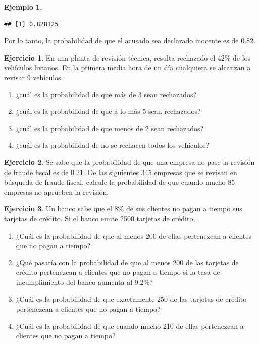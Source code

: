 \documentclass[
  11pt,
]{book}
\providecommand{\tightlist}{%
  \setlength{\itemsep}{0pt}\setlength{\parskip}{0pt}}
\theoremstyle{definition}
\theoremstyle{definition}
\newtheorem{example}{Ejemplo}[chapter]
\theoremstyle{definition}
\newtheorem{exercise}{Ejercicio}[chapter]
\theoremstyle{definition}
\theoremstyle{remark}
\begin{document}
\begin{example}
\begin{verbatim}
## [1] 0.828125
\end{verbatim}

Por lo tanto, la probabilidad de que el acusado sea declarado inocente es de 0.82.
\end{example}

\begin{exercise}

En una planta de revisión técnica, resulta rechazado el \(42 \%\) de los vehículos livianos. En la primera media hora de un día cualquiera se alcanzan a revisar 9 vehículos.

\begin{enumerate}
\def\labelenumi{\arabic{enumi}.}
\tightlist
\item
  ¿cuál es la probabilidad de que más de 3 sean rechazados?
\item
  ¿cuál es la probabilidad de que a lo más 5 sean rechazados?
\item
  ¿cuál es la probabilidad de que menos de 2 sean rechazados?
\item
  ¿cuál es la probabilidad de no se rechacen todos los vehículos?
\end{enumerate}

\end{exercise}

\begin{exercise}
Se sabe que la probabilidad de que una empresa no pase la revisión de fraude fiscal es de 0.21. De las siguientes 345 empresas que se revisan en búsqueda de fraude fiscal, calcule la probabilidad de que cuando mucho 85 empresas no aprueben la revisión.
\end{exercise}

\begin{exercise}

Un banco sabe que el 8\% de sus clientes no pagan a tiempo sus tarjetas de crédito. Si el banco emite 2500 tarjetas de crédito,

\begin{enumerate}
\def\labelenumi{\arabic{enumi}.}
\tightlist
\item
  ¿Cuál es la probabilidad de que al menos 200 de ellas pertenezcan a clientes que no pagan a tiempo?
\item
  ¿Qué pasaría con la probabilidad de que al menos 200 de las tarjetas de crédito pertenezcan a clientes que no pagan a tiempo si la tasa de incumplimiento del banco aumenta al 9.2\%?
\item
  ¿Cuál es la probabilidad de que exactamente 250 de las tarjetas de crédito pertenezcan a clientes que no pagan a tiempo?
\item
  ¿Cuál es la probabilidad de que cuando mucho 210 de ellas pertenezcan a clientes que no pagan a tiempo?
\end{enumerate}

\end{exercise}
\end{document}
